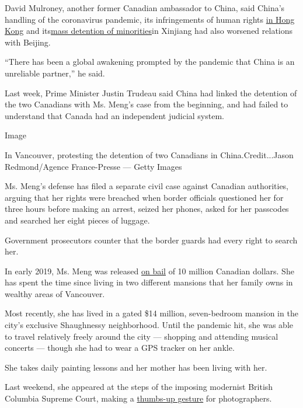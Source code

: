 David Mulroney, another former Canadian ambassador to China, said
China's handling of the coronavirus pandemic, its infringements of human
rights
\href{https://www.nytimes3xbfgragh.onion/2020/05/21/us/politics/trump-china-hong-kong.html}{in
Hong Kong} and
its\href{https://www.nytimes3xbfgragh.onion/interactive/2019/11/16/world/asia/china-xinjiang-documents.html}{mass
detention of minorities}in Xinjiang had also worsened relations with
Beijing.

``There has been a global awakening prompted by the pandemic that China
is an unreliable partner,'' he said.

Last week, Prime Minister Justin Trudeau said China had linked the
detention of the two Canadians with Ms. Meng's case from the beginning,
and had failed to understand that Canada had an independent judicial
system.

Image

In Vancouver, protesting the detention of two Canadians in
China.Credit...Jason Redmond/Agence France-Presse --- Getty Images

Ms. Meng's defense has filed a separate civil case against Canadian
authorities, arguing that her rights were breached when border officials
questioned her for three hours before making an arrest, seized her
phones, asked for her passcodes and searched her eight pieces of
luggage.

Government prosecutors counter that the border guards had every right to
search her.

In early 2019, Ms. Meng was released
\href{https://www.nytimes3xbfgragh.onion/2019/03/04/world/canada/huawei-canada-meng-wanzhou.html?module=inline}{on
bail} of 10 million Canadian dollars. She has spent the time since
living in two different mansions that her family owns in wealthy areas
of Vancouver.

Most recently, she has lived in a gated \$14 million, seven-bedroom
mansion in the city's exclusive Shaughnessy neighborhood. Until the
pandemic hit, she was able to travel relatively freely around the city
--- shopping and attending musical concerts --- though she had to wear a
GPS tracker on her ankle.

She takes daily painting lessons and her mother has been living with
her.

Last weekend, she appeared at the steps of the imposing modernist
British Columbia Supreme Court, making a
\href{https://www.cbc.ca/news/canada/british-columbia/meng-wanzhou-photographs-posing-court-1.5582689}{thumbs-up
gesture} for photographers.

